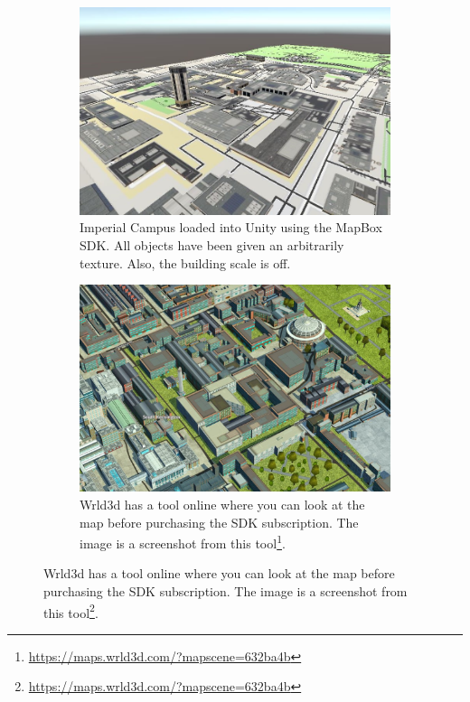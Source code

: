 \begin{figure}[!htbp] 
\centering
\begin{minipage}{.45\textwidth}
\centering
\begin{subfigure}{\textwidth}
        \includegraphics[width=\linewidth, left]{06_Implementation/00_Maps/Images/MapBox1Cropped.JPG}
        \caption{Imperial Campus loaded into Unity using the MapBox SDK. All objects have been given an arbitrarily texture. Also, the building scale is off.}
        \label{maps:figure:MapBox}
    \end{subfigure}
\end{minipage}
\qquad
\begin{minipage}{.45\textwidth}
    \centering
    \begin{subfigure}{\textwidth}
        \includegraphics[width=\linewidth, right]{06_Implementation/00_Maps/Images/Wrld3D1Cropped.JPG}
        \caption{Wrld3d has a tool online where you can look at the map before purchasing the SDK subscription. The image is a screenshot from this tool\footnote{\url{https://maps.wrld3d.com/?mapscene=632ba4b}}.}
        \label{maps:figure:Wrld3D}
    \end{subfigure}
\end{minipage}
\end{figure}

